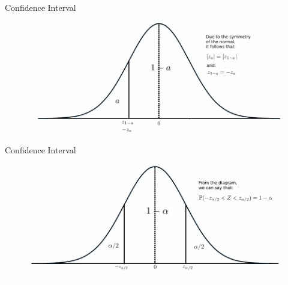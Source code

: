 \documentclass[handout]{beamer}
\begin{document}
\begin{frame}{Confidence Interval}


\begin{figure}[h!]
	\centering
	\includegraphics[scale=0.8]{pics/conf_int_2.pdf}
\end{figure}


 
\end{frame}


\begin{frame}{Confidence Interval}


\begin{figure}[h!]
	\centering
	\includegraphics[scale=0.8]{pics/conf_int_3.pdf}
\end{figure}


 
\end{frame}
\end{document}
